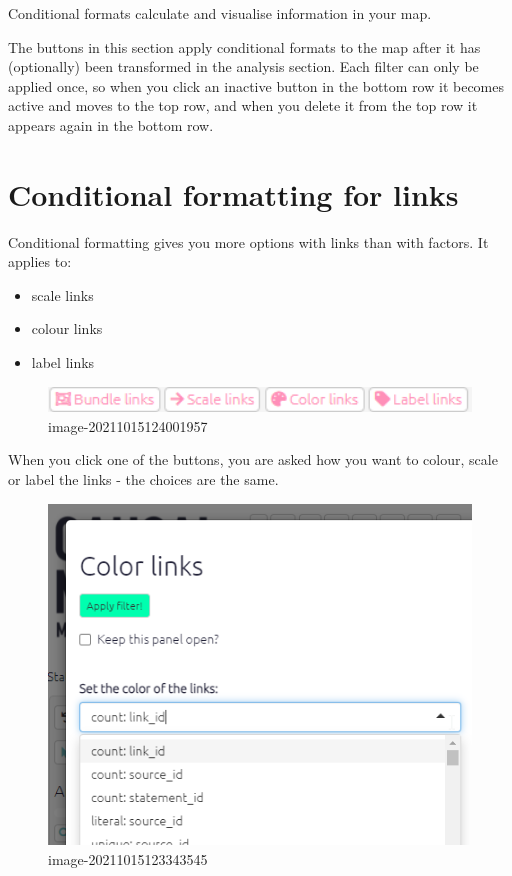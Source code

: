 \documentclass[
]{book}
\providecommand{\tightlist}{%
  \setlength{\itemsep}{0pt}\setlength{\parskip}{0pt}}
\begin{document}
Conditional formats calculate and visualise information in your map.

The buttons in this section apply conditional formats to the map after it has (optionally) been transformed in the analysis section. Each filter can only be applied once, so when you click an inactive button in the bottom row it becomes active and moves to the top row, and when you delete it from the top row it appears again in the bottom row.

\hypertarget{xformatting-links}{%
\section{Conditional formatting for links}\label{xformatting-links}}

Conditional formatting gives you more options with links than with factors. It applies to:

\begin{itemize}
\tightlist
\item
  scale links
\item
  colour links
\item
  label links
\end{itemize}

\begin{figure}
\centering
\includegraphics[width=6.77083in,height=\textheight]{_assets/image-20211015124001957.png}
\caption{image-20211015124001957}
\end{figure}

When you click one of the buttons, you are asked how you want to colour, scale or label the links - the choices are the same.

\begin{figure}
\centering
\includegraphics[width=6.77083in,height=\textheight]{_assets/image-20211015123343545.png}
\caption{image-20211015123343545}
\end{figure}
\end{document}
